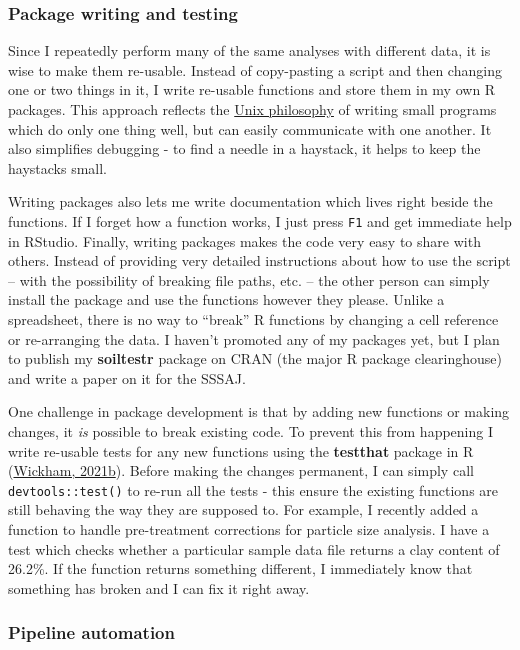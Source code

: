 \documentclass[
  letterpaper,
  openany]{book}
\begin{document}
\hypertarget{package-writing-and-testing}{%
\subsubsection{Package writing and testing}\label{package-writing-and-testing}}

Since I repeatedly perform many of the same analyses with different data, it is wise to make them re-usable.
Instead of copy-pasting a script and then changing one or two things in it, I write re-usable functions and store them in my own R packages.
This approach reflects the \href{https://en.wikipedia.org/wiki/Unix_philosophy}{Unix philosophy} of writing small programs which do only one thing well, but can easily communicate with one another.
It also simplifies debugging - to find a needle in a haystack, it helps to keep the haystacks small.

Writing packages also lets me write documentation which lives right beside the functions.
If I forget how a function works, I just press \texttt{F1} and get immediate help in RStudio.
Finally, writing packages makes the code very easy to share with others. Instead of providing very detailed instructions about how to use the script -- with the possibility of breaking file paths, etc. -- the other person can simply install the package and use the functions however they please.
Unlike a spreadsheet, there is no way to ``break'' R functions by changing a cell reference or re-arranging the data.
I haven't promoted any of my packages yet, but I plan to publish my \textbf{soiltestr} package on CRAN (the major R package clearinghouse) and write a paper on it for the SSSAJ.

One challenge in package development is that by adding new functions or making changes, it \emph{is} possible to break existing code.
To prevent this from happening I write re-usable tests for any new functions using the \textbf{testthat} package in R (\protect\hyperlink{ref-R-testthat}{Wickham, 2021b}).
Before making the changes permanent, I can simply call \texttt{devtools::test()} to re-run all the tests - this ensure the existing functions are still behaving the way they are supposed to.
For example, I recently added a function to handle pre-treatment corrections for particle size analysis.
I have a test which checks whether a particular sample data file returns a clay content of 26.2\%.
If the function returns something different, I immediately know that something has broken and I can fix it right away.

\hypertarget{pipeline-automation}{%
\subsubsection{Pipeline automation}\label{pipeline-automation}}
\end{document}

